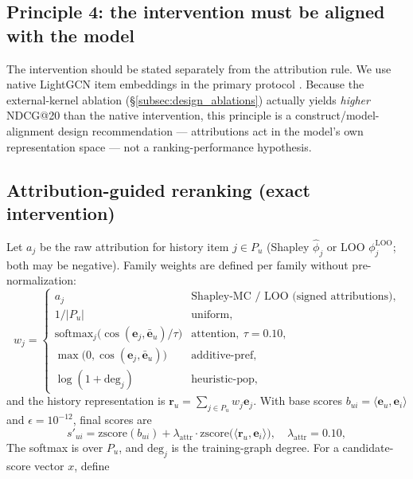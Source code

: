 \documentclass[pdflatex,sn-mathphys-num]{sn-jnl}
\begin{document}
\subsection{Principle 4: the intervention must be aligned with the model}\label{subsec:principle_intervention}

The intervention should be stated separately from the attribution rule. We use native LightGCN item embeddings in the primary protocol \cite{he2020lightgcn,wang2019ngcf}. Because the external-kernel ablation (\S\ref{subsec:design_ablations}) actually yields \emph{higher} NDCG@20 than the native intervention, this principle is a construct/model-alignment design recommendation --- attributions act in the model's own representation space --- not a ranking-performance hypothesis.

\subsection{Attribution-guided reranking (exact intervention)}\label{subsec:reranking}
Let $a_j$ be the raw attribution for history item $j\in P_u$ (Shapley $\hat{\phi}_j$ or LOO $\phi^{\text{LOO}}_j$; both may be negative). Family weights are defined per family without pre-normalization:
\begin{equation}\label{eq:weights}
w_j = \begin{cases} a_j & \text{Shapley-MC / LOO (signed attributions)},\\ 1/|P_u| & \text{uniform},\\ \mathrm{softmax}_j\bigl(\cos(\mathbf{e}_j,\bar{\mathbf{e}}_u)/\tau\bigr) & \text{attention},\ \tau=0.10,\\ \max\bigl(0,\cos(\mathbf{e}_j,\bar{\mathbf{e}}_u)\bigr) & \text{additive-pref},\\ \log(1+\mathrm{deg}_j) & \text{heuristic-pop}, \end{cases}
\end{equation}
and the history representation is $\mathbf{r}_u = \sum_{j\in P_u} w_j \mathbf{e}_j$. With base scores $b_{ui}= \langle \mathbf{e}_u,\mathbf{e}_i\rangle$ and $\epsilon=10^{-12}$, final scores are
\begin{equation}\label{eq:rerank}
s'_{ui} = \mathrm{zscore}(b_{ui}) + \lambda_{\text{attr}}\cdot \mathrm{zscore}\bigl(\langle \mathbf{r}_u,\mathbf{e}_i\rangle\bigr),\quad \lambda_{\text{attr}}=0.10,
\end{equation}
The softmax is over $P_u$, and $\mathrm{deg}_j$ is the training-graph degree. For a candidate-score vector $x$, define
\end{document}
